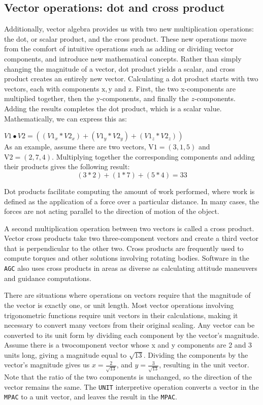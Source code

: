 \documentclass[refcap, oxford]{ahsan}
\begin{document}
\subsection{Vector operations: dot and cross product}
Additionally, vector algebra provides us with two new multiplication operations: the dot, or scalar product, and the cross product. These new operations move from the comfort of intuitive operations such as adding or dividing vector components, and introduce new mathematical concepts. Rather than simply changing the magnitude of a vector, dot product yields a scalar, and cross product creates an entirely new vector. Calculating a dot product starts with two vectors, each with components $\mathrm{x}, \mathrm{y}$ and z. First, the two x-components are multiplied together, then the y-components, and finally the $z$-components. Adding the results completes the dot product, which is a scalar value. Mathematically, we can express this as:


$V 1 \bullet V 2=\left(\left(V 1_{x} * V 2_{x}\right)+\left(V 1_{y} * V 2_{y}\right)+\left(V 1_{z} * V 2_{z}\right)\right)$\\
As an example, assume there are two vectors, $\mathrm{V} 1=(3,1,5)$ and $\mathrm{V} 2=(2,7,4)$. Multiplying together the corresponding components and adding their products gives the following result:
$$
(3 * 2)+(1 * 7)+(5 * 4)=33
$$

Dot products facilitate computing the amount of work performed, where work is defined as the application of a force over a particular distance. In many cases, the forces are not acting parallel to the direction of motion of the object.

A second multiplication operation between two vectors is called a cross product. Vector cross products take two three-component vectors and create a third vector that is perpendicular to the other two. Cross products are frequently used to compute torques and other solutions involving rotating bodies. Software in the \texttt{AGC} also uses cross products in areas as diverse as calculating attitude maneuvers and guidance computations.

There are situations where operations on vectors require that the magnitude of the vector is exactly one, or unit length. Most vector operations involving trigonometric functions require unit vectors in their calculations, making it necessary to convert many vectors from their original scaling. Any vector can be converted to its unit form by dividing each component by the vector's magnitude. Assume there is a twocomponent vector whose x and y components are 2 and 3 units long, giving a magnitude equal to $\sqrt{13}$. Dividing the components by the vector's magnitude gives us $x=\frac{2}{\sqrt{13}}$, and $y=\frac{3}{\sqrt{13}}$, resulting in the unit vector. Note that the ratio of the two components is unchanged, so the direction of the vector remains the same. The \texttt{UNIT} interpretive operation converts a vector in the \texttt{MPAC} to a unit vector, and leaves the result in the \texttt{MPAC}.
\end{document}
